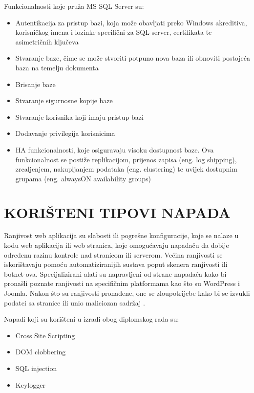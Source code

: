 \documentclass[12pt, oneside, onecolumn]{book}
\begin{document}
{Funkcionalnosti koje pruža MS SQL Server su: \cite{mssql}

\begin{itemize}
\item Autentikacija za pristup bazi, koja može obavljati preko Windows akreditiva, korisničkog imena i lozinke specifični za SQL server, certifikata te asimetričnih ključeva
\item Stvaranje baze, čime se može stvoriti potpuno nova baza ili obnoviti postojeća baza na temelju dokumenta
\item Brisanje baze
\item Stvaranje sigurnosne kopije baze
\item Stvaranje korisnika koji imaju pristup bazi
\item Dodavanje privilegija korisnicima
\item HA funkcionalnosti, koje osiguravaju visoku dostupnost baze. Ova funkcionalnost se postiže replikacijom, prijenos zapisa (eng. log shipping), zrcaljenjem, nakupljanjem podataka (eng. clustering) te uvijek dostupnim grupama (eng. alwaysON availability groups)
\end{itemize}

\chapter{KORIŠTENI TIPOVI NAPADA}
Ranjivost web aplikacija su slabosti ili pogrešne konfiguracije, koje se nalaze u kodu web aplikacija ili web stranica, koje omogućavaju napadaču da dobije određenu razinu kontrole nad stranicom ili serverom. Većina ranjivosti se iskorištavaju pomoću automatiziranijih sustava poput skenera ranjivosti ili botnet-ova. Specijalizirani alati su napravljeni od strane napadača kako bi pronašli poznate ranjivosti na specifičnim platformama kao što su WordPress i Joomla. Nakon što su ranjivosti pronađene, one se zloupotrijebe kako bi se izvukli podatci sa stranice ili unio maliciozan sadržaj \cite{ranj}.

Napadi koji su korišteni u izradi obog diplomskog rada su:

\begin{itemize}
\item Cross Site Scripting
\item DOM clobbering
\item SQL injection
\item Keylogger
\end{itemize}

}
\end{document}

